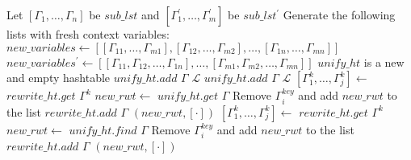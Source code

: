 \documentclass{article}
\begin{document}
\begin{algorithm}
\begin{algorithmic}[1]
    \State Let $[\Gamma_1, \dotsc, \Gamma_n]$ be $sub\_lst$ and $[\Gamma_{1}^{'}, \dotsc, \Gamma_{m}^{'}]$ be $sub\_lst^{'}$
    \State Generate the following lists with fresh context variables:
    \State $new\_variables \gets [[\Gamma_{11}, \dotsc, \Gamma_{m1}], [\Gamma_{12}, \dotsc, \Gamma_{m2}], \dotsc, [\Gamma_{1n}, \dotsc, \Gamma_{mn}]]$
    \State $new\_variables^{'} \gets [[\Gamma_{11}, \Gamma_{12}, \dotsc, \Gamma_{1n}], \dotsc, [\Gamma_{m1}, \Gamma_{m2}, \dotsc, \Gamma_{mn}]]$
    \State $unify\_ht$ is a new and empty hashtable
      \State $unify\_ht.add$ $\Gamma$ $\mathcal{L}$
    \EndFor
      \State $unify\_ht.add$ $\Gamma$ $\mathcal{L}$
    \EndFor
        \State $[\Gamma_{1}^{k}, \dotsc, \Gamma_{j}^{k}] \gets$ $rewrite\_ht.get$ $\Gamma_{}^{k}$
            \State $new\_rwt \gets$ $unify\_ht.get$ $\Gamma$
            \State Remove $\Gamma_{i}^{key}$ and add $new\_rwt$ to the list
            \State $rewrite\_ht.add$ $\Gamma$ $(new\_rwt, [\cdot])$
          \EndIf
        \EndFor
      \EndFor
    \EndFor
        \State $[\Gamma_{1}^{k}, \dotsc, \Gamma_{j}^{k}] \gets$ $rewrite\_ht.get$ $\Gamma_{}^{k}$
            \State $new\_rwt \gets$ $unify\_ht.find$ $\Gamma$
            \State Remove $\Gamma_{i}^{key}$ and add $new\_rwt$ to the list
            \State $rewrite\_ht.add$ $\Gamma$ $(new\_rwt, [\cdot])$
          \EndIf
        \EndFor
      \EndFor
    \EndFor
    \EndFunction
    \State
  \end{algorithmic}
\end{algorithm}
\end{document}
